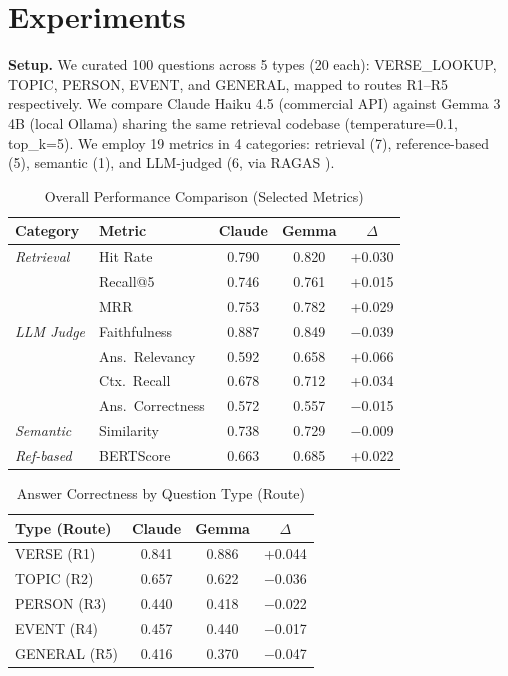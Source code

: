 \documentclass[10pt,conference,letterpaper]{IEEEtran}
\begin{document}
\section{Experiments}

\textbf{Setup.} We curated 100 questions across 5 types (20 each): VERSE\_LOOKUP, TOPIC, PERSON, EVENT, and GENERAL, mapped to routes R1--R5 respectively. We compare Claude Haiku 4.5 (commercial API) \cite{anthropic2024} against Gemma 3 4B (local Ollama) \cite{gemma2025} sharing the same retrieval codebase (temperature=0.1, top\_k=5). We employ 19 metrics in 4 categories: retrieval (7), reference-based (5), semantic (1), and LLM-judged (6, via RAGAS \cite{ragas2024}).

\begin{table}[h]
\centering
\caption{Overall Performance Comparison (Selected Metrics)}
\label{tab:metrics}
\footnotesize
\begin{tabular}{@{}llccc@{}}
\toprule
Category & Metric & Claude & Gemma & $\Delta$ \\
\midrule
\textit{Retrieval} & Hit Rate      & 0.790 & 0.820 & +0.030 \\
                    & Recall@5      & 0.746 & 0.761 & +0.015 \\
                    & MRR           & 0.753 & 0.782 & +0.029 \\
\midrule
\textit{LLM Judge} & Faithfulness  & 0.887 & 0.849 & $-$0.039 \\
                    & Ans.\ Relevancy & 0.592 & 0.658 & +0.066 \\
                    & Ctx.\ Recall  & 0.678 & 0.712 & +0.034 \\
                    & Ans.\ Correctness & 0.572 & 0.557 & $-$0.015 \\
\midrule
\textit{Semantic}   & Similarity    & 0.738 & 0.729 & $-$0.009 \\
\midrule
\textit{Ref-based}  & BERTScore     & 0.663 & 0.685 & +0.022 \\
\bottomrule
\end{tabular}
\end{table}

\begin{table}[h]
\centering
\caption{Answer Correctness by Question Type (Route)}
\label{tab:pertype}
\footnotesize
\begin{tabular}{@{}lccc@{}}
\toprule
Type (Route) & Claude & Gemma & $\Delta$ \\
\midrule
VERSE (R1)   & 0.841 & 0.886 & +0.044 \\
TOPIC (R2)   & 0.657 & 0.622 & $-$0.036 \\
PERSON (R3)  & 0.440 & 0.418 & $-$0.022 \\
EVENT (R4)   & 0.457 & 0.440 & $-$0.017 \\
GENERAL (R5) & 0.416 & 0.370 & $-$0.047 \\
\bottomrule
\end{tabular}
\end{table}
\end{document}

